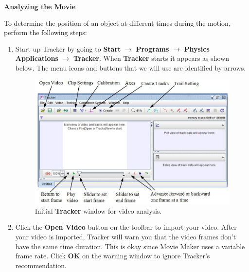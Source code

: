 \textbf{Analyzing the Movie} 

To determine the position of an object at different times during the
motion, perform the following steps:

\begin{enumerate}

\item Start up Tracker by going to {\bf Start} $\rightarrow$ {\bf Programs} $\rightarrow$ {\bf Physics Applications} $\rightarrow$ {\bf Tracker}. 
When {\bf Tracker} starts it appears as shown below. The menu icons and buttons that we will use are identified by arrows.
\begin{figure}[hbt]
\begin{center}
\includegraphics[width=5.5in]{Tracker_figure.eps}
\caption{Initial {\bf Tracker} window for video analysis.}
\end{center}
\end{figure}

\item Click the {\bf Open Video} button on the toolbar to import your video. 
After your video is imported, Tracker will warn you that the video frames 
don't have the same time duration. 
This is okay since Movie Maker uses a variable frame rate. 
Click {\bf OK} on the warning window to ignore Tracker's recommendation.


\end{enumerate}
